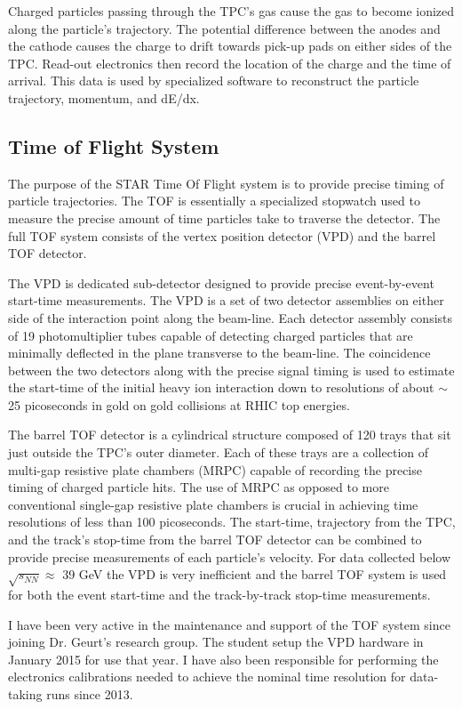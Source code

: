		Charged particles passing through the TPC's gas cause the gas to become ionized along the particle's trajectory. The potential difference between the anodes and the cathode causes the charge to drift towards pick-up pads on either sides of the TPC. Read-out electronics then record the location of the charge and the time of arrival. This data is used by specialized software to reconstruct the particle trajectory, momentum, and dE/dx.

	\subsection{ Time of Flight System }
		The purpose of the STAR Time Of Flight system is to provide precise timing of particle trajectories. The TOF is essentially a specialized stopwatch used to measure the precise amount of time particles take to traverse the detector. The full TOF system consists of the vertex position detector (VPD) and the barrel TOF detector.

		The VPD is dedicated sub-detector designed to provide precise event-by-event start-time measurements. The VPD is a set of two detector assemblies on either side of the interaction point along the beam-line. Each detector assembly consists of 19 photomultiplier tubes capable of detecting charged particles that are minimally deflected in the plane transverse to the beam-line. The coincidence between the two detectors along with the precise signal timing is used to estimate the start-time of the initial heavy ion interaction down to resolutions of about $\sim$25 picoseconds in gold on gold collisions at RHIC top energies\cite{llope_star_2014}.

		The barrel TOF detector is a cylindrical structure composed of 120 trays that sit just outside the TPC's outer diameter. Each of these trays are a collection of multi-gap resistive plate chambers (MRPC) capable of recording the precise timing of charged particle hits. The use of MRPC as opposed to more conventional single-gap resistive plate chambers is crucial in achieving time resolutions of less than 100 picoseconds. The start-time, trajectory from the TPC, and the track's stop-time from the barrel TOF detector can be combined to provide precise measurements of each particle's velocity. For data collected below $\sqrt{s_{NN}} \approx $ 39 GeV the VPD is very inefficient and the barrel TOF system is used for both the event start-time and the track-by-track stop-time measurements. 

		I have been very active in the maintenance and support of the TOF system since joining Dr. Geurt's research group. The student setup the VPD hardware in January 2015 for use that year. I have also been responsible for performing the electronics calibrations needed to achieve the nominal time resolution for data-taking runs since 2013.